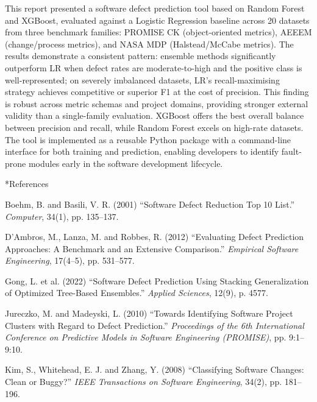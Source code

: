 \documentclass[10pt, a4paper]{article}
\makeatletter
\renewcommand\section{\@startsection{section}{1}{\z@}{0.8em}{0.1em}{\normalfont\Large\bfseries}}
\makeatother
\begin{document}
This report presented a software defect prediction tool based on Random Forest and XGBoost, evaluated against a Logistic Regression baseline across 20 datasets from three benchmark families: PROMISE CK (object-oriented metrics), AEEEM (change/process metrics), and NASA MDP (Halstead/McCabe metrics). The results demonstrate a consistent pattern: ensemble methods significantly outperform LR when defect rates are moderate-to-high and the positive class is well-represented; on severely imbalanced datasets, LR's recall-maximising strategy achieves competitive or superior F1 at the cost of precision. This finding is robust across metric schemas and project domains, providing stronger external validity than a single-family evaluation. XGBoost offers the best overall balance between precision and recall, while Random Forest excels on high-rate datasets. The tool is implemented as a reusable Python package with a command-line interface for both training and prediction, enabling developers to identify fault-prone modules early in the software development lifecycle.

\section*{References}

\noindent Boehm, B. and Basili, V. R. (2001) ``Software Defect Reduction Top 10 List.'' \textit{Computer}, 34(1), pp. 135--137.

\vspace{0.3em}
\noindent D'Ambros, M., Lanza, M. and Robbes, R. (2012) ``Evaluating Defect Prediction Approaches: A Benchmark and an Extensive Comparison.'' \textit{Empirical Software Engineering}, 17(4--5), pp. 531--577.

\vspace{0.3em}
\noindent Gong, L. et al. (2022) ``Software Defect Prediction Using Stacking Generalization of Optimized Tree-Based Ensembles.'' \textit{Applied Sciences}, 12(9), p. 4577.

\vspace{0.3em}
\noindent Jureczko, M. and Madeyski, L. (2010) ``Towards Identifying Software Project Clusters with Regard to Defect Prediction.'' \textit{Proceedings of the 6th International Conference on Predictive Models in Software Engineering (PROMISE)}, pp. 9:1--9:10.

\vspace{0.3em}
\noindent Kim, S., Whitehead, E. J. and Zhang, Y. (2008) ``Classifying Software Changes: Clean or Buggy?'' \textit{IEEE Transactions on Software Engineering}, 34(2), pp. 181--196.
\end{document}

